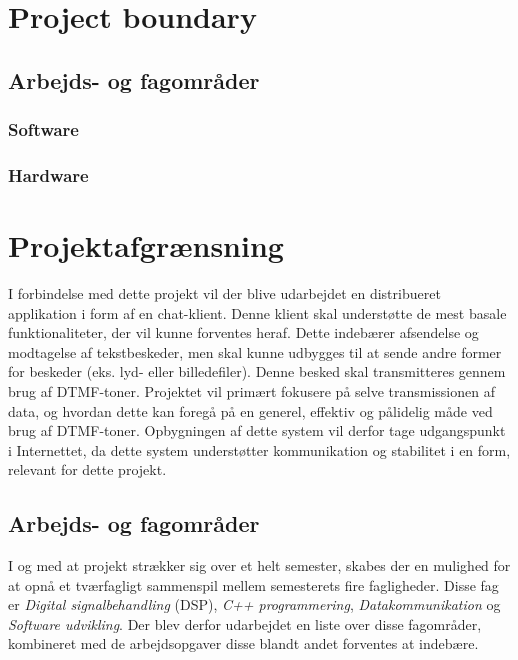 \section{Project boundary}%

\subsection{Arbejds- og fagområder}
 

\subsubsection{Software}


\subsubsection{Hardware}


\section{Projektafgrænsning}
I forbindelse med dette projekt vil der blive udarbejdet en distribueret applikation i form af en chat-klient. Denne klient skal understøtte de mest basale funktionaliteter, der vil kunne forventes heraf. Dette indebærer afsendelse og modtagelse af tekstbeskeder, men skal kunne udbygges til at sende andre former for beskeder (eks. lyd- eller billedefiler). Denne besked skal transmitteres gennem brug af DTMF-toner. 
Projektet vil primært fokusere på selve transmissionen af data, og hvordan dette kan foregå på en generel, effektiv og pålidelig måde ved brug af DTMF-toner. Opbygningen af dette system vil derfor tage udgangspunkt i Internettet, da dette system understøtter kommunikation og stabilitet i en form, relevant for dette projekt. 



\subsection{Arbejds- og fagområder}

I og med at projekt strækker sig over et helt semester, skabes der en mulighed for at opnå et tværfagligt sammenspil mellem semesterets fire fagligheder. Disse fag er \textit{Digital signalbehandling} (DSP), \textit{ C++ programmering}, \textit{Datakommunikation} og \textit{Software udvikling}. Der blev derfor udarbejdet en liste over disse fagområder, kombineret med de arbejdsopgaver disse blandt andet forventes at indebære.   


